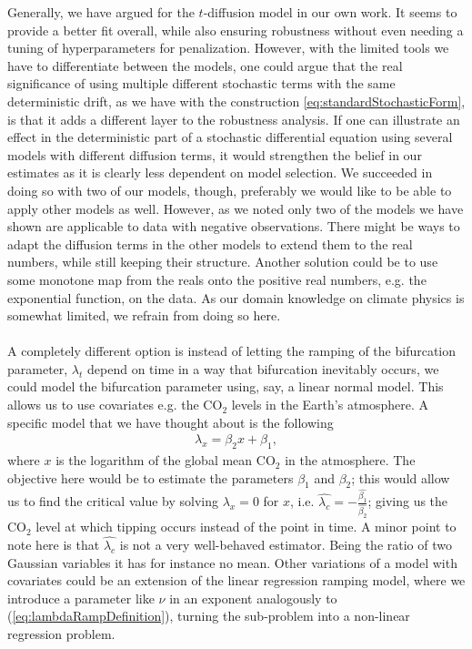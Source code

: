 Generally, we have argued for the $t$-diffusion model in our own work. It seems to provide a better fit overall, while also ensuring robustness without even needing a tuning of hyperparameters for penalization. However, with the limited tools we have to differentiate between the models, one could argue that the real significance of using multiple different stochastic terms with the same deterministic drift, as we have with the construction \ref{eq:standardStochasticForm}, is that it adds a different layer to the robustness analysis. If one can illustrate an effect in the deterministic part of a stochastic differential equation using several models with different diffusion terms, it would strengthen the belief in our estimates as it is clearly less dependent on model selection. We succeeded in doing so with two of our models, though, preferably we would like to be able to apply other models as well. However, as we noted only two of the models we have shown are applicable to data with negative observations. There might be ways to adapt the diffusion terms in the other models to extend them to the real numbers, while still keeping their structure. Another solution could be to use some monotone map from the reals onto the positive real numbers, e.g. the exponential function, on the data. As our domain knowledge on climate physics is somewhat limited, we refrain from doing so here.\\\\
A completely different option is instead of letting the ramping of the bifurcation parameter, $\lambda_t$ depend on time in a way that bifurcation inevitably occurs, we could model the bifurcation parameter using, say, a linear normal model. This allows us to use covariates e.g. the $\mathrm{CO}_2$ levels in the Earth's atmosphere. A specific model that we have thought about is the following
\begin{align}
    \lambda_x= \beta_2 x + \beta_1, \label{eq:alternativeLambda}
\end{align}
where $x$ is the logarithm of the global mean $\mathrm{CO}_2$ in the atmosphere. The objective here would be to estimate the parameters $\beta_1$ and $\beta_2$; this would allow us to find the critical value by solving $\lambda_x = 0$ for $x$, i.e. $\hat{\lambda_c} = -\frac{\hat{\beta_1}}{\hat{\beta_2}}$; giving us the $\mathrm{CO}_2$ level at which tipping occurs instead of the point in time. A minor point to note here is that $\hat{\lambda_c}$ is not a very well-behaved estimator. Being the ratio of two Gaussian variables it has for instance no mean. Other variations of a model with covariates could be an extension of the linear regression ramping model, where we introduce a parameter like $\nu$ in an exponent analogously to (\ref{eq:lambdaRampDefinition}), turning the sub-problem into a non-linear regression problem. \\\\
